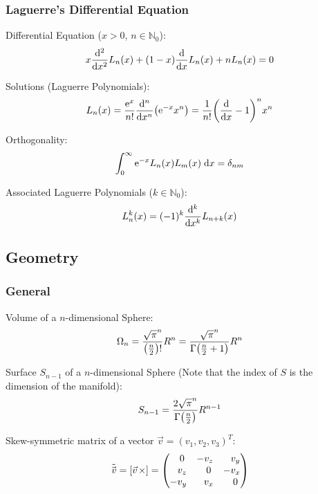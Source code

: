 		\subsubsection{Laguerre's Differential Equation}
			\noindent
			Differential Equation ($x>0$, $n\in\mathbb{N}_0$):
			\begin{equation}
				x\dv[2]{x}L_n(x) +(1-x)\dv{x}L_n(x) + nL_n(x) = 0
			\end{equation}

			\noindent
			Solutions (Laguerre Polynomials):
			\begin{equation}
				L_n(x) = \frac{\mathrm{e}^x}{n!}\dv[n]{x}(\mathrm{e}^{-x} x^n) = \frac{1}{n!} \qty(\dv{x}-1)^n x^n
			\end{equation}

			\noindent
			Orthogonality:
			\begin{equation}
				\int_0^\infty \mathrm{e}^{-x} L_n(x) L_m(x)\;\dd x = \delta_{nm}
			\end{equation}

			\noindent
			Associated Laguerre Polynomials ($k\in\mathbb{N}_0$):
			\begin{equation}
				L_n^k(x) = (-1)^k\dv[k]{x} L_{n+k}(x)
			\end{equation}

	\subsection{Geometry}
		\subsubsection{General}
			\noindent
			Volume of a $n$-dimensional Sphere:
			\begin{equation}
				\Omega_n = \frac{\sqrt{\pi}^n}{\qty(\frac{n}{2})!}R^n
				= \frac{\sqrt{\pi}^n}{\Gamma\qty(\frac{n}{2}+1)}R^n
			\end{equation}

			\noindent
			Surface $S_{n-1}$ of a $n$-dimensional Sphere (Note that the index of $S$ is the dimension of the manifold):
			\begin{equation}
				S_{n-1} = \frac{2\sqrt{\pi}^n}{\Gamma\qty(\frac{n}{2})}R^{n-1}
			\end{equation}

			\noindent
			Skew-symmetric matrix of a vector $\vec{v} = (v_1, v_2, v_3)^T$:
			\begin{equation}
				\tilde{\vec{v}} = \qty[\vec{v}\times] =
				\qty( \begin{matrix}
					\M 0   & -v_z   & \M v_y \\
					\M v_z & \M 0   & - v_x \\
					-v_y   & \M v_x & \M 0 \\
				\end{matrix} ) \\
			\end{equation}

